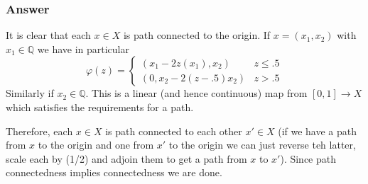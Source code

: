 \documentclass[10pt]{article}
\begin{document}
\subsubsection{Answer}
It is clear that each $x \in X $ is path connected to the origin.  If $x=(x_1,x_2)$ with $x_1 \in \mathbb{Q}$ we have in particular
\[\varphi(z)= \left\{ \begin{array}{lr}
(x_1- 2 z (x_1),x_2)& z \leq .5 \\
(0,x_2- 2 (z-.5) x_2)& z > .5
 \end{array}\right.
\]
Similarly if $x_2 \in \mathbb{Q}$. This is a linear (and hence continuous) map from $[0,1] \to X$ which satisfies the requirements for a path.

Therefore, each $x\in X $ is path connected to each other $x' \in X$ (if we have a path from $x$ to the origin and one from $x'$ to the origin we can just reverse teh latter, scale each by (1/2) and adjoin them to get a path from $x$ to $x'$). Since path connectedness implies connectedness we are done.
\end{document}
